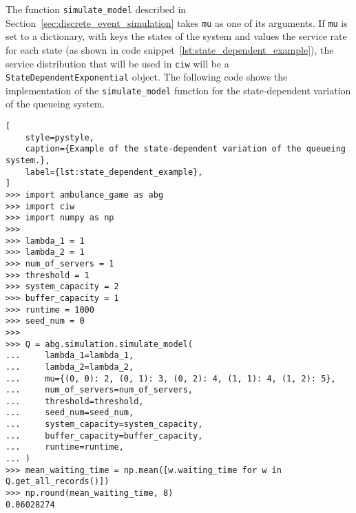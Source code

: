 The function \texttt{simulate\_model} described in
Section~\ref{sec:discrete_event_simulation} takes \texttt{mu} as one of its
arguments.
If \texttt{mu} is set to a dictionary, with keys the states of the system and
values the service rate for each state (as shown in code
snippet~\ref{lst:state_dependent_example}), the service
distribution that will be
used in \texttt{ciw} will be a \texttt{StateDependentExponential} object.
The following code shows the implementation of the
\texttt{simulate\_model} function for the state-dependent variation of the
queueing system.

\begin{lstlisting}[
    style=pystyle,
    caption={Example of the state-dependent variation of the queueing system.},
    label={lst:state_dependent_example},
]
>>> import ambulance_game as abg
>>> import ciw
>>> import numpy as np
>>>
>>> lambda_1 = 1
>>> lambda_2 = 1
>>> num_of_servers = 1
>>> threshold = 1
>>> system_capacity = 2
>>> buffer_capacity = 1
>>> runtime = 1000
>>> seed_num = 0
>>>
>>> Q = abg.simulation.simulate_model(
...     lambda_1=lambda_1,
...     lambda_2=lambda_2,
...     mu={(0, 0): 2, (0, 1): 3, (0, 2): 4, (1, 1): 4, (1, 2): 5},
...     num_of_servers=num_of_servers,
...     threshold=threshold,
...     seed_num=seed_num,
...     system_capacity=system_capacity,
...     buffer_capacity=buffer_capacity,
...     runtime=runtime,
... )
>>> mean_waiting_time = np.mean([w.waiting_time for w in Q.get_all_records()])
>>> np.round(mean_waiting_time, 8)
0.06028274

\end{lstlisting}
